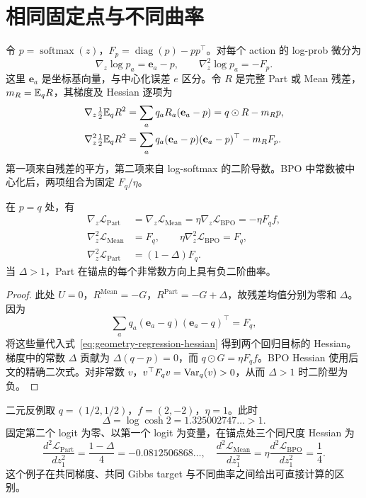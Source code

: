 \section{相同固定点与不同曲率}
\label{sec:geometry-curvature}
令 $p=\operatorname{softmax}(z)$，$F_p=\operatorname{diag}(p)-pp^\top$。对每个 action 的 log-prob 微分为
\begin{equation}
\nabla_z\log p_a=\mathbf e_a-p,\qquad
\nabla_z^2\log p_a=-F_p.
\end{equation}
这里 $\mathbf e_a$ 是坐标基向量，与中心化误差 $e$ 区分。令 $R$ 是完整 Part 或 Mean 残差，$m_R=\mathbb E_qR$，其梯度及 Hessian 逐项为
\begin{align}
\nabla_z\tfrac12\mathbb E_qR^2
&=\sum_a q_aR_a(\mathbf e_a-p)=q\odot R-m_Rp,\\
\nabla_z^2\tfrac12\mathbb E_qR^2
&=\sum_a q_a(\mathbf e_a-p)(\mathbf e_a-p)^\top-m_RF_p.
\label{eq:geometry-regression-hessian}
\end{align}
第一项来自残差的平方，第二项来自 log-softmax 的二阶导数。BPO 中常数被中心化后，两项组合为固定 $F_q/\eta$。

\begin{proposition}[锚点处的梯度与曲率]
\label{prop:geometry-anchor}
在 $p=q$ 处，有
\begin{align}
\nabla_z\mathcal L_{\mathrm{Part}}
&=\nabla_z\mathcal L_{\mathrm{Mean}}
=\eta\nabla_z\mathcal L_{\mathrm{BPO}}=-\eta F_qf,\\
\nabla_z^2\mathcal L_{\mathrm{Mean}}&=F_q,\qquad
\eta\nabla_z^2\mathcal L_{\mathrm{BPO}}=F_q,\\
\nabla_z^2\mathcal L_{\mathrm{Part}}&=(1-\Delta)F_q.
\end{align}
当 $\Delta>1$，Part 在锚点的每个非常数方向上具有负二阶曲率。
\end{proposition}
\begin{proof}
此处 $U=0$，$R^{\mathrm{Mean}}=-G$，$R^{\mathrm{Part}}=-G+\Delta$，故残差均值分别为零和 $\Delta$。因为
\begin{equation}
\sum_aq_a(\mathbf e_a-q)(\mathbf e_a-q)^\top=F_q,
\end{equation}
将这些量代入式~\eqref{eq:geometry-regression-hessian} 得到两个回归目标的 Hessian。梯度中的常数 $\Delta$ 贡献为 $\Delta(q-p)=0$，而 $q\odot G=\eta F_qf$。BPO Hessian 使用后文的精确二次式。对非常数 $v$，$v^\top F_qv=\operatorname{Var}_q(v)>0$，从而 $\Delta>1$ 时二阶型为负。
\end{proof}

二元反例取 $q=(1/2,1/2)$，$f=(2,-2)$，$\eta=1$。此时
\begin{equation}
\Delta=\log\cosh2=1.325002747\ldots>1.
\end{equation}
固定第二个 logit 为零、以第一个 logit 为变量，在锚点处三个同尺度 Hessian 为
\begin{equation}
\frac{d^2\mathcal L_{\mathrm{Part}}}{dz_1^2}
=\frac{1-\Delta}{4}=-0.0812506868\ldots,
\quad \frac{d^2\mathcal L_{\mathrm{Mean}}}{dz_1^2}
=\eta\frac{d^2\mathcal L_{\mathrm{BPO}}}{dz_1^2}=\frac14.
\end{equation}
这个例子在共同梯度、共同 Gibbs target 与不同曲率之间给出可直接计算的区别。

